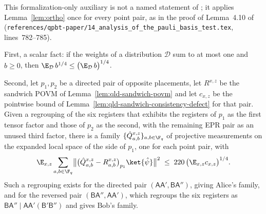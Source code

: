 \begin{lemma}
	\label{lem:qld-sandwich-orthonormalization}
	\leanok
	This formalization-only auxiliary is not a named statement of
	\cite{Ji2020MIPStar}; it applies Lemma~\ref{lem:ortho} once for every
	point pair, as in the proof of Lemma~4.10 of \cite{Ji2020MIPStar}
	(\texttt{references/qpbt-paper/14\_analysis\_of\_the\_pauli\_basis\_test.tex},
	lines~782--785).

	First, a scalar fact: if the weights of a distribution $\mathcal D$ sum to
	at most one and $b \ge 0$, then
	$\E_{\mathcal D}\, b^{1/4} \le \bigl(\E_{\mathcal D}\, b\bigr)^{1/4}$.

	Second, let $p_1, p_2$ be a directed pair of opposite placements, let
	$R^{x,z}$ be the sandwich POVM of
	Lemma~\ref{lem:qld-sandwich-povm} and let $c_{x,z}$ be the pointwise bound
	of Lemma~\ref{lem:qld-sandwich-consistency-defect} for that pair. Given a
	regrouping of the six registers that exhibits the registers of $p_1$ as
	the first tensor factor and those of $p_2$ as the second, with the
	remaining EPR pair as an unused third factor, there is a family
	$\{\hat{Q}^{x,z}_{a,b}\}_{a,b \in \F_q}$ of projective measurements on the
	expanded local space of the side of $p_1$, one for each point pair, with
	\[
		\E_{x,z} \sum_{a,b \in \F_q}
		\bigl\lVert \bigl(\hat{Q}^{x,z}_{a,b} - R^{x,z}_{a,b}\bigr)_{p_1}
		\ket{\hat\psi} \bigr\rVert^2
		\;\le\; 220 \, \bigl(\E_{x,z} c_{x,z}\bigr)^{1/4} .
	\]
	Such a regrouping exists for the directed pair
	$(\mathsf{A}\mathsf{A}', \mathsf{B}\mathsf{A}'')$, giving Alice's family,
	and for the reversed pair
	$(\mathsf{B}\mathsf{A}'', \mathsf{A}\mathsf{A}')$, which regroups the six
	registers as
	$\mathsf{B}\mathsf{A}'' \mid \mathsf{A}\mathsf{A}'(\mathsf{B}'\mathsf{B}'')$
	and gives Bob's family.
\end{lemma}
